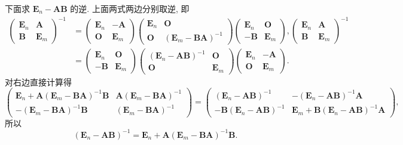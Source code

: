 \documentclass[../../main.tex]{subfiles}
\begin{document}
\begin{solution}
下面求 $\boldsymbol{E}_n - \boldsymbol{AB}$ 的逆. 上面两式两边分别取逆, 即
\begin{align*}
\begin{pmatrix} \boldsymbol{E}_n & \boldsymbol{A} \\ \boldsymbol{B} & \boldsymbol{E}_m \end{pmatrix}^{-1} &= \begin{pmatrix} \boldsymbol{E}_n & -\boldsymbol{A} \\ \boldsymbol{O} & \boldsymbol{E}_m \end{pmatrix} \begin{pmatrix} \boldsymbol{E}_n & \boldsymbol{O} \\ \boldsymbol{O} & (\boldsymbol{E}_m - \boldsymbol{BA})^{-1} \end{pmatrix} \begin{pmatrix} \boldsymbol{E}_n & \boldsymbol{O} \\ -\boldsymbol{B} & \boldsymbol{E}_m \end{pmatrix},
\begin{pmatrix} \boldsymbol{E}_n & \boldsymbol{A} \\ \boldsymbol{B} & \boldsymbol{E}_m \end{pmatrix}^{-1} 
\\
&= \begin{pmatrix} \boldsymbol{E}_n & \boldsymbol{O} \\ -\boldsymbol{B} & \boldsymbol{E}_m \end{pmatrix} \begin{pmatrix} (\boldsymbol{E}_n - \boldsymbol{AB})^{-1} & \boldsymbol{O} \\ \boldsymbol{O} & \boldsymbol{E}_m \end{pmatrix} \begin{pmatrix} \boldsymbol{E}_n & -\boldsymbol{A} \\ \boldsymbol{O} & \boldsymbol{E}_m \end{pmatrix}.
\end{align*}
对右边直接计算得
\[
\begin{pmatrix} \boldsymbol{E}_n + \boldsymbol{A}(\boldsymbol{E}_m - \boldsymbol{BA})^{-1}\boldsymbol{B} & \boldsymbol{A}(\boldsymbol{E}_m - \boldsymbol{BA})^{-1} \\ -(\boldsymbol{E}_m - \boldsymbol{BA})^{-1}\boldsymbol{B} & (\boldsymbol{E}_m - \boldsymbol{BA})^{-1} \end{pmatrix}
= \begin{pmatrix} (\boldsymbol{E}_n - \boldsymbol{AB})^{-1} & -(\boldsymbol{E}_n - \boldsymbol{AB})^{-1}\boldsymbol{A} \\ -\boldsymbol{B}(\boldsymbol{E}_n - \boldsymbol{AB})^{-1} & \boldsymbol{E}_m + \boldsymbol{B}(\boldsymbol{E}_n - \boldsymbol{AB})^{-1}\boldsymbol{A} \end{pmatrix},
\]
所以
\[
(\boldsymbol{E}_n - \boldsymbol{AB})^{-1} = \boldsymbol{E}_n + \boldsymbol{A}(\boldsymbol{E}_m - \boldsymbol{BA})^{-1}\boldsymbol{B}.
\]
\end{solution}
\end{document}
